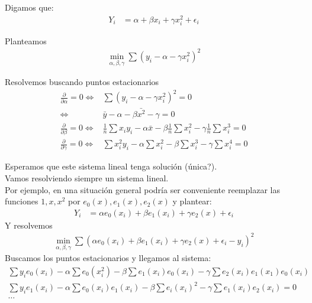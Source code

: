 \documentclass[10pt]{article}
\theoremstyle{plain}
\theoremstyle{definition}
\begin{document}
Digamos que:
\begin{align*}
Y_{i} &= \alpha + \beta x_{i} + \gamma x_{i}^2 + \epsilon_{i}
\end{align*}

Planteamos 
\begin{align*}
\min_{\alpha,\beta,\gamma} \sum (y_{i}-\alpha-\gamma x_{i}^2)^2
\end{align*}

Resolvemos buscando puntos estacionarios
\begin{align*}
\frac{\partial}{\partial \alpha} = 0 \Leftrightarrow & \sum (y_{i}-\alpha-\gamma x_{i}^2)^2 = 0\\
\Leftrightarrow & \bar{y} - \alpha - \beta \bar{x^2} - \gamma = 0\\
\frac{\partial}{\partial \beta} = 0 \Leftrightarrow & \frac{1}{n}\sum x_{i}y_{i} - \alpha \bar{x} - \beta \frac{1}{n} \sum x_{i}^2 - \gamma \frac{1}{n} \sum x_{i}^3 = 0\\
\frac{\partial}{\partial \gamma} = 0 \Leftrightarrow &  \sum x_{i}^2y_{i} - \alpha\sum x_{i}^2 - \beta \sum x_{i}^3 - \gamma \sum x_{i}^4 = 0
 \end{align*}
 
 Esperamos que este sistema lineal tenga solución (única?).\\
 
 Vamos resolviendo siempre un sistema lineal.\\
 
 Por ejemplo, en una situación general podría ser conveniente reemplazar las funciones $1,x,x^2$ por  $e_{0}(x),e_{1}(x), e_{2}(x)$ y plantear:
 \begin{align*}
 Y_{i} &= \alpha e_{0}(x_{i}) + \beta e_{1}(x_{i}) + \gamma e_{2}(x) + \epsilon_{i}
 \end{align*}
 Y resolvemos 
 \begin{align*}
 \min_{\alpha, \beta, \gamma} \sum (\alpha e_{0}(x_{i}) + \beta e_{1}(x_{i}) + \gamma e_{2}(x) + \epsilon_{i} - y_{i})^2
 \end{align*}
 Buscamos los puntos estacionarios y llegamos al sistema:
 \begin{align*}
 \sum y_{i}e_{0}(x_{i}) - \alpha\sum e_{0}(x_{i}^2) -\beta\sum e_{1}(x_{i})e_{0}(x_{i}) - \gamma\sum e_{2}(x_{i})e_{1}(x_{1})e_{0}(x_{i})\\
 \sum y_{i}e_{1}(x_{i}) - \alpha \sum e_{0}(x_{i})e_{1}(x_{i}) - \beta\sum e_{i}(x_{i})^2 - \gamma \sum e_{1}(x_{i})e_{2}(x_{i}) = 0\\
 \ldots
 \end{align*}
 
\end{document}
